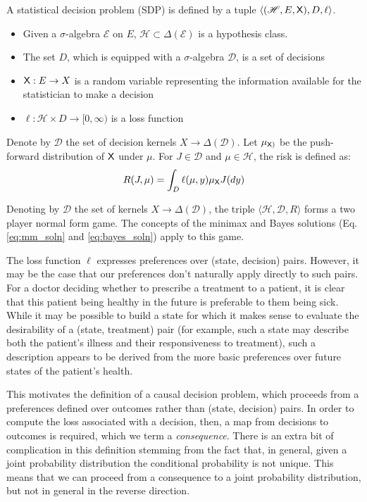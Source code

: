 \begin{definition}
A statistical decision problem (SDP) is defined by a tuple $\langle (\mathscr{H},E, \mathsf{X}), D, \ell\rangle$.
\begin{itemize}
    \item Given a $\sigma$-algebra $\mathcal{E}$ on $E$, $\mathscr{H}\subset\Delta(\mathcal{E})$ is a hypothesis class.
    \item The set $D$, which is equipped with a $\sigma$-algebra $\mathcal{D}$, is a set of decisions
    \item $\mathsf{X}:E\to X$ is a random variable representing the information available for the statistician to make a decision
    \item $\ell:\mathcal{H}\times D\to [0,\infty)$ is a loss function
\end{itemize}

Denote by $\mathscr{D}$ the set of decision kernels $X\to \Delta(\mathcal{D})$. Let $\mu_{\mathsf{X})}$ be the push-forward distribution of $\mathsf{X}$ under $\mu$. For $J\in \mathscr{D}$ and $\mu\in \mathcal{H}$, the risk is defined as:
\begin{align}
    R(J,\mu) = \int_D \ell(\mu,y) \mu_{\mathsf{X}} J(dy)
\end{align}


Denoting by $\mathscr{D}$  the set of kernels $X\to \Delta(\mathcal{D})$, the triple $\langle \mathscr{H}, \mathscr{D}, R\rangle$ forms a two player normal form game. The concepts of the minimax and Bayes solutions (Eq. \ref{eq:mm_soln} and \ref{eq:bayes_soln}) apply to this game.
\end{definition}

The loss function $\ell$ expresses preferences over (state, decision) pairs. However, it may be the case that our preferences don't naturally apply directly to such pairs. For a doctor deciding whether to prescribe a treatment to a patient, it is clear that this patient being healthy in the future is preferable to them being sick. While it may be possible to build a state for which it makes sense to evaluate the desirability of a (state, treatment) pair (for example, such a state may describe both the patient's illness and their responsiveness to treatment), such a description appears to be derived from the more basic preferences over future states of the patient's health.

This motivates the definition of a causal decision problem, which proceeds from a preferences defined over outcomes rather than (state, decision) pairs. In order to compute the loss associated with a decision, then, a map from decisions to outcomes is required, which we term a \emph{consequence}. There is an extra bit of complication in this definition stemming from the fact that, in general, given a joint probability distribution the conditional probability is not unique. This means that we can proceed from a consequence to a joint probability distribution, but not in general in the reverse direction.

